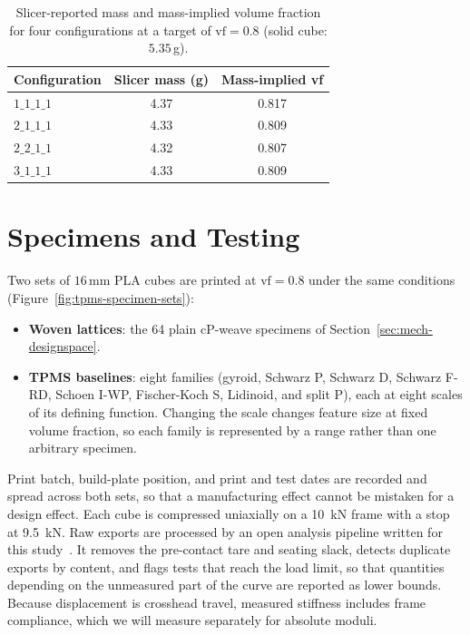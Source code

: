 \begin{table}[htbp]
\centering
\begin{tabular}{@{}lcc@{}}
\toprule
\textbf{Configuration} & \textbf{Slicer mass (g)} & \textbf{Mass-implied vf} \\
\midrule
$1\_1\_1\_1$ & 4.37 & 0.817 \\
$2\_1\_1\_1$ & 4.33 & 0.809 \\
$2\_2\_1\_1$ & 4.32 & 0.807 \\
$3\_1\_1\_1$ & 4.33 & 0.809 \\
\bottomrule
\end{tabular}
\caption{Slicer-reported mass and mass-implied volume fraction for four configurations at a target of $\mathrm{vf}=0.8$ (solid cube: $5.35\,$g).}
\label{tab:print-mass}
\end{table}

\section{Specimens and Testing}
\label{sec:tpms-specimens}

Two sets of $16\,\mathrm{mm}$ PLA cubes are printed at $\mathrm{vf}=0.8$ under the same conditions (Figure~\ref{fig:tpms-specimen-sets}):

\begin{itemize}
\item \textbf{Woven lattices}: the 64 plain cP-weave specimens of Section~\ref{sec:mech-designspace}.
\item \textbf{TPMS baselines}: eight families (gyroid, Schwarz P, Schwarz D, Schwarz F-RD, Schoen I-WP, Fischer-Koch S, Lidinoid, and split P), each at eight scales of its defining function. Changing the scale changes feature size at fixed volume fraction, so each family is represented by a range rather than one arbitrary specimen.
\end{itemize}

Print batch, build-plate position, and print and test dates are recorded and spread across both sets, so that a manufacturing effect cannot be mistaken for a design effect. Each cube is compressed uniaxially on a 10~kN frame with a stop at 9.5~kN. Raw exports are processed by an open analysis pipeline written for this study~\cite{companal2026}. It removes the pre-contact tare and seating slack, detects duplicate exports by content, and flags tests that reach the load limit, so that quantities depending on the unmeasured part of the curve are reported as lower bounds. Because displacement is crosshead travel, measured stiffness includes frame compliance, which we will measure separately for absolute moduli.

